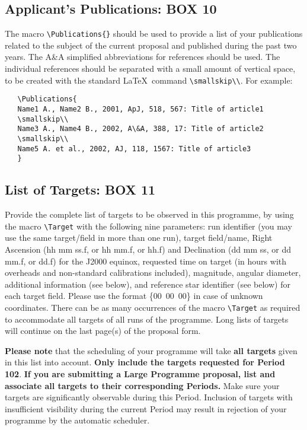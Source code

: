 \documentclass{article}
\begin{document}
\subsection{Applicant's  Publications: {\bf BOX 10}}

The macro \verb|\Publications{}| should be used to 
provide a list of your publications related to the
subject of the current proposal and published during the past two
years. The A\&A simplified abbreviations for references should be
used. The individual references should be separated with a small
amount of vertical space, to be created with the standard \LaTeX\
command \verb|\smallskip\\|. For example:
\begin{verbatim}
   \Publications{
   Name1 A., Name2 B., 2001, ApJ, 518, 567: Title of article1
   \smallskip\\
   Name3 A., Name4 B., 2002, A\&A, 388, 17: Title of article2
   \smallskip\\
   Name5 A. et al., 2002, AJ, 118, 1567: Title of article3
   }
\end{verbatim}

\subsection{List of Targets: {\bf BOX 11}}
  
Provide the complete list of targets to be observed in this programme,
by using the macro \verb|\Target| 
with the following nine parameters: run identifier (you may use the same
target/field in more than one run), target field/name, Right Ascension
(hh mm ss.f, or hh mm.f, or hh.f) and Declination (dd mm ss, or dd
mm.f, or dd.f) for the J2000 equinox, requested time on target (in hours
with overheads and non-standard calibrations included), magnitude, angular diameter,
additional information (see below), and reference star identifier
(see below) for each target field.  Please use the format \{00~00~00\}
in case of unknown coordinates. There can be as many occurrences of
the macro \verb|\Target| as required to accommodate all targets of all
runs of the programme. Long lists of targets will continue
on the last page(s) of the proposal form.

{\bf Please note} that the scheduling of your programme will take
{\bf all targets} given in this list into account. {\bf Only include
 the targets requested for Period 102}.
{\bf If you are submitting a Large Programme proposal, list and associate all targets to their corresponding Periods.}
Make sure your targets are significantly observable during this Period. Inclusion of targets with insufficient visibility during the current Period may result in
rejection of your programme by the automatic scheduler.
\end{document}
